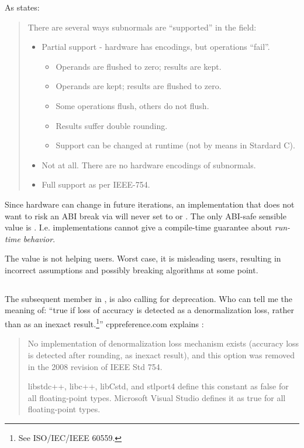 As \textcite{WG14N2993} states:
\begin{quote}{}
There are several ways subnormals are “supported” in the field:

\begin{itemize}
  \item Partial support - hardware has encodings, but operations “fail”.
  \begin{itemize}
    \item Operands are flushed to zero; results are kept.
    \item Operands are kept; results are flushed to zero.
    \item Some operations flush, others do not flush.
    \item Results suffer double rounding.
    \item Support can be changed at runtime (not by means in Stardard C).
  \end{itemize}
  \item Not at all. There are no hardware encodings of subnormals.
  \item Full support as per IEEE-754.
\end{itemize}
\end{quote}

Since hardware can change in future iterations, an implementation that does not want to 
risk an ABI break via  will never set  to 
 or . The only ABI-safe sensible value is 
. I.e. implementations cannot give a compile-time guarantee 
about \emph{run-time behavior}.

The  value is not helping \CC{} users. Worst case, it is misleading 
users, resulting in incorrect assumptions and possibly breaking algorithms at some point.

\subsection{}

The subsequent member in ,  is also calling for 
deprecation. Who can tell me the meaning of: “true if loss of accuracy is detected as a 
denormalization loss, rather than as an inexact result.\footnote{See ISO/IEC/IEEE 60559.}” 
cppreference.com explains \cite{has_denorm_loss.cppreference}:
\begin{quote}{}
  No implementation of denormalization loss mechanism exists (accuracy loss is detected 
  after rounding, as inexact result), and this option was removed in the 2008 revision of 
  IEEE Std 754.

  libstdc++, libc++, libCstd, and stlport4 define this constant as false for all 
  floating-point types. Microsoft Visual Studio defines it as true for all floating-point 
  types.
\end{quote}

